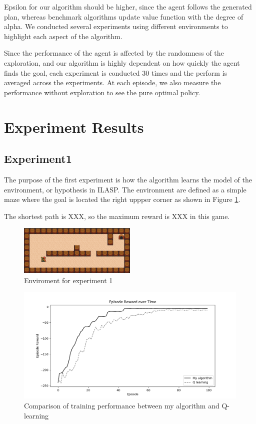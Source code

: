 Epsilon for our algorithm should be higher, since the agent follows the generated plan, 
whereas benchmark algorithms update value function with the degree of alpha. 
We conducted several experiments using different environments to highlight each aspect of the algorithm.

Since the performance of the agent is affected by the randomness of the exploration, 
and our algorithm is highly dependent on how quickly the agent finds the goal, 
each experiment is conducted 30 times and the perform is averaged across the experiments.
At each episode, we also measure the performance without exploration to see the pure optimal policy.

\section{Experiment Results}
\label{learning_evaluation}

\subsection{Experiment1}
The purpose of the first experiment is how the algorithm learns the model of the environment, or hypothesis in ILASP.
The environment are defined as a simple maze where the goal is located the right uppper corner as shown in Figure \ref{experiment1}.


The shortest path is XXX, so the maximum reward is XXX in this game. 

\begin{figure}[!htb]
\centering
\includegraphics[width=0.5\textwidth]{./figures/experiment1}
\caption{Enviroment for experiment 1}
\label{experiment1}
\end{figure}

\begin{figure}[!htb]
\centering
\includegraphics[width=1.0\textwidth]{./figures/experiment1_training}
\caption{Comparison of training performance between my algorithm and Q-learning}
\label{experiment1_training}
\end{figure}

